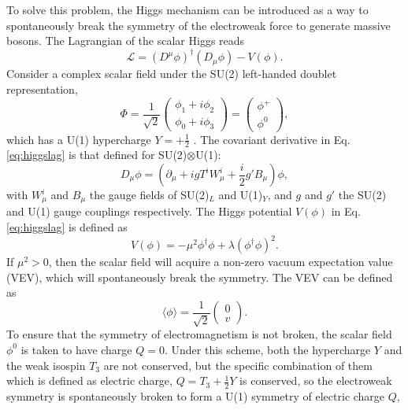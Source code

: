 \documentclass[a4paper,12pt]{article}
\begin{document}
To solve this problem, the Higgs mechanism can be introduced as a way to spontaneously break the symmetry of the electroweak force to generate massive bosons. 
The Lagrangian of the scalar Higgs reads
\begin{equation}
    \label{eq:higgslag}
    \mathcal{L} = (D^\mu\phi)^\dagger(D_\mu\phi) - V(\phi).
\end{equation}
Consider a complex scalar field under the SU(2) left-handed doublet representation,
\begin{equation}
    \label{eq:doubscal}
    \Phi = \frac{1}{\sqrt{2}}\begin{pmatrix}\phi_1+i\phi_2\\\phi_0+i\phi_3\end{pmatrix} = \begin{pmatrix} \phi^+\\\phi^0\end{pmatrix},
\end{equation}
which has a U(1) hypercharge $Y=+\frac12$ \cite{l}.
The covariant derivative in Eq.\eqref{eq:higgslag} is that defined for SU(2)$\otimes$U(1):
\begin{equation}
    \label{eq:covarhiggs}
    D_\mu\phi = \left(\partial_\mu + igT^iW_\mu^i + \frac{i}{2}g'B_\mu\right)\phi,
\end{equation}
with $W^i_\mu$ and $B_\mu$ the gauge fields of SU(2)$_L$ and U(1)$_Y$, and $g$ and $g'$ the SU(2) and U(1) gauge couplings respectively. 
The Higgs potential $V(\phi)$ in Eq.\eqref{eq:higgslag} is defined as
\begin{equation}
    \label{eq:goldpot}
    V(\phi) = -\mu^2\phi^\dagger\phi + \lambda(\phi^\dagger\phi)^2.
\end{equation}
If $\mu^2>0$, then the scalar field will acquire a non-zero vacuum expectation value (VEV), which will spontaneously break the symmetry. 
The VEV can be defined as
\begin{equation}
    \label{eq:vev}
    \langle\phi\rangle = \frac{1}{\sqrt{2}}\begin{pmatrix}0\\v\end{pmatrix}.
\end{equation}
To ensure that the symmetry of electromagnetism is not broken, the scalar field $\phi^0$ is taken to have charge $Q=0$.
Under this scheme, both the hypercharge $Y$ and the weak isospin $T_3$ are not conserved, but the specific combination of them which is defined as electric charge, $Q=T_3+\frac12 Y$ is conserved, so the electroweak symmetry is spontaneously broken to form a U(1) symmetry of electric charge $Q$,
\end{document}
